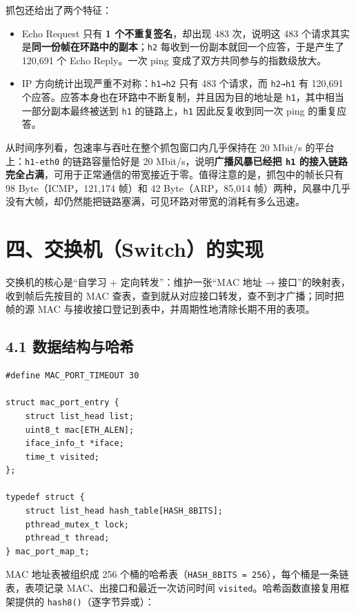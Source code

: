 \documentclass[UTF8,12pt,a4paper,fontset=fandol]{ctexart}
\begin{document}
抓包还给出了两个特征：

\begin{itemize}[leftmargin=1.7em]
  \item Echo Request 只有 \textbf{1 个不重复签名}，却出现 483 次，说明这 483 个请求其实是\textbf{同一份帧在环路中的副本}；\texttt{h2} 每收到一份副本就回一个应答，于是产生了 120,691 个 Echo Reply。一次 ping 变成了双方共同参与的指数级放大。
  \item IP 方向统计出现严重不对称：\texttt{h1→h2} 只有 483 个请求，而 \texttt{h2→h1} 有 120,691 个应答。应答本身也在环路中不断复制，并且因为目的地址是 \texttt{h1}，其中相当一部分副本最终被送到 \texttt{h1} 的链路上，\texttt{h1} 因此反复收到同一次 ping 的重复应答。
\end{itemize}

从时间序列看，包速率与吞吐在整个抓包窗口内几乎保持在 20 Mbit/s 的平台上：\texttt{h1-eth0} 的链路容量恰好是 20 Mbit/s，说明\textbf{广播风暴已经把 \texttt{h1} 的接入链路完全占满}，可用于正常通信的带宽接近于零。值得注意的是，抓包中的帧长只有 98 Byte（ICMP，121,174 帧）和 42 Byte（ARP，85,014 帧）两种，风暴中几乎没有大帧，却仍然能把链路塞满，可见环路对带宽的消耗有多么迅速。

\section*{四、交换机（Switch）的实现}

交换机的核心是“自学习 + 定向转发”：维护一张“MAC 地址 → 接口”的映射表，收到帧后先按目的 MAC 查表，查到就从对应接口转发，查不到才广播；同时把帧的源 MAC 与接收接口登记到表中，并周期性地清除长期不用的表项。

\subsection*{4.1 数据结构与哈希}

\begin{verbatim}
#define MAC_PORT_TIMEOUT 30

struct mac_port_entry {
    struct list_head list;
    uint8_t mac[ETH_ALEN];
    iface_info_t *iface;
    time_t visited;
};

typedef struct {
    struct list_head hash_table[HASH_8BITS];
    pthread_mutex_t lock;
    pthread_t thread;
} mac_port_map_t;
\end{verbatim}

MAC 地址表被组织成 256 个桶的哈希表（\texttt{HASH_8BITS = 256}），每个桶是一条链表，表项记录 MAC、出接口和最近一次访问时间 \texttt{visited}。哈希函数直接复用框架提供的 \texttt{hash8()}（逐字节异或）：
\end{document}
